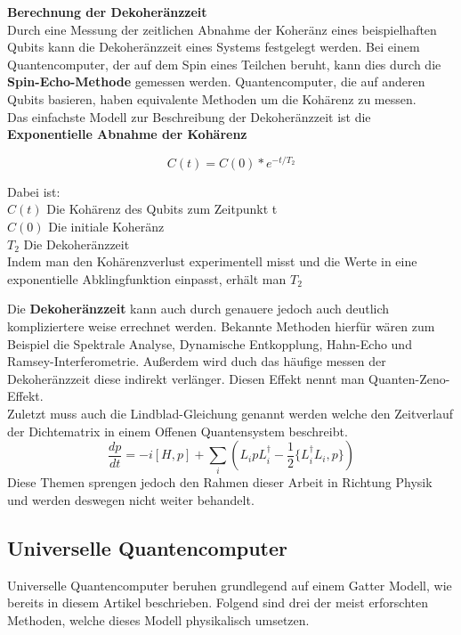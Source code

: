 \textbf{Berechnung der Dekoheränzzeit}\\
Durch eine Messung der zeitlichen Abnahme der Koheränz eines beispielhaften Qubits kann die Dekoheränzzeit eines Systems festgelegt werden.
Bei einem Quantencomputer, der auf dem Spin eines Teilchen beruht, kann dies durch die \textbf{Spin-Echo-Methode} gemessen werden.
Quantencomputer, die auf anderen Qubits basieren, haben equivalente Methoden um die Kohärenz zu messen.\\

Das einfachste Modell zur Beschreibung der Dekoheränzzeit ist die \textbf{Exponentielle Abnahme der Kohärenz}

\begin{equation}
    C(t) = C(0)*e^{-t/T_2}
\end{equation}

Dabei ist:\\
$C(t)$ Die Kohärenz des Qubits zum Zeitpunkt t\\
$C(0)$ Die initiale Koheränz\\
$T_2$ Die Dekoheränzzeit\\

Indem man den Kohärenzverlust experimentell misst und die Werte in eine exponentielle Abklingfunktion einpasst, erhält man $T_2$\\

\begin{tcolorbox}[title=Kommentar,
    title filled=false,
    colback=cyan!5!white,
    colframe=cyan!75!black]
    Die \textbf{Dekoheränzzeit} kann auch durch genauere jedoch auch deutlich kompliziertere weise errechnet werden.
    Bekannte Methoden hierfür wären zum Beispiel die Spektrale Analyse, Dynamische Entkopplung, Hahn-Echo und Ramsey-Interferometrie.
    Außerdem wird duch das häufige messen der Dekoheränzzeit diese indirekt verlänger. Diesen Effekt nennt man Quanten-Zeno-Effekt.\\
    Zuletzt muss auch die Lindblad-Gleichung genannt werden welche den Zeitverlauf der Dichtematrix in einem Offenen Quantensystem beschreibt.
    \begin{equation}
        \frac{dp}{dt} = -i[H,p]+\sum_i(L_ipL^\dagger_i-\frac{1}{2}\{L^\dagger_i L_i,p\})
    \end{equation}
    Diese Themen sprengen jedoch den Rahmen dieser Arbeit in Richtung Physik und werden deswegen nicht weiter behandelt.
\end{tcolorbox}

\subsection{Universelle Quantencomputer}
\label{sub:universelle_quantencomputer}
Universelle Quantencomputer beruhen grundlegend auf einem Gatter Modell, wie bereits in diesem Artikel beschrieben. Folgend sind drei der meist erforschten
Methoden, welche dieses Modell physikalisch umsetzen.\\

